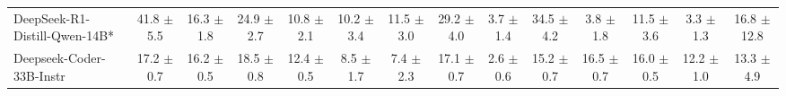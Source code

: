 \begin{table}[t]
{\begin{tabular}{l *{13}{c}}
\rowcolor{gray!10}
 DeepSeek-R1-Distill-Qwen-14B* &
41.8 {\tiny$\pm$ 5.5} & 
16.3 {\tiny$\pm$ 1.8} & 
24.9 {\tiny$\pm$ 2.7} & 
10.8 {\tiny$\pm$ 2.1} &
10.2 {\tiny$\pm$ 3.4} & 
11.5 {\tiny$\pm$ 3.0} & 
29.2 {\tiny$\pm$ 4.0} & 
3.7 {\tiny$\pm$ 1.4} &
34.5 {\tiny$\pm$ 4.2} & 
3.8 {\tiny$\pm$ 1.8} & 
11.5 {\tiny$\pm$ 3.6} & 
3.3 {\tiny$\pm$ 1.3} &
16.8 {\tiny$\pm$ 12.8} \\



Deepseek-Coder-33B-Instr 
 & 17.2 {\tiny$\pm$ 0.7} & 
 16.2 {\tiny$\pm$ 0.5} & 
 18.5 {\tiny$\pm$ 0.8} & 
 12.4 {\tiny$\pm$ 0.5} & 
 8.5 {\tiny$\pm$ 1.7} & 
 7.4 {\tiny$\pm$ 2.3} & 
 17.1 {\tiny$\pm$ 0.7} & 
 2.6 {\tiny$\pm$ 0.6} & 
 15.2 {\tiny$\pm$ 0.7} & 
 16.5 {\tiny$\pm$ 0.7} & 
 16.0 {\tiny$\pm$ 0.5} & 
 12.2 {\tiny$\pm$ 1.0} & 
 13.3 {\tiny$\pm$ 4.9} \\


\bottomrule
\end{tabular}%
}
\end{table}
